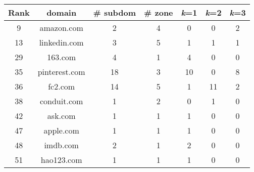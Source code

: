 \begin{tabular}{|c||c|c|c|c|c|c|} \hline
\bf Rank& \bf domain & \bf \# subdom &  \bf \# zone & {\bf {\em k}=1} & {\bf {\em k}=2} & {\bf {\em k}=3}\\ \hline
9      & amazon.com  & 2  & 4 & 0 &  0 & 2 \\ \hline %
13      & linkedin.com  & 3  &  5 &  1   & 1 & 1\\ \hline %
29      & 163.com  & 4  & 1 & 4   & 0 & 0\\ \hline
35      & pinterest.com  & 18   & 3 & 10 & 0 & 8\\ \hline %
36      & fc2.com & 14  & 5 & 1   & 11 & 2 \\ \hline %
38      & conduit.com  & 1  & 2 & 0   & 1 & 0\\ \hline
42      & ask.com  & 1  & 1 & 1   & 0 & 0\\ \hline
47      & apple.com  & 1  & 1 & 1   & 0 & 0\\ \hline
48     & imdb.com  & 2  & 1 & 2  & 0 & 0  \\ \hline %
51      & hao123.com  & 1  & 1 & 1   & 0 & 0\\ \hline
\end{tabular}
